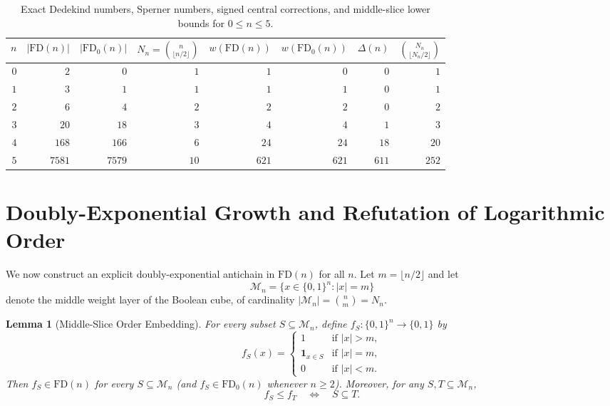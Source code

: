 \documentclass[11pt]{article}
\newtheorem{lemma}[theorem]{Lemma}
\theoremstyle{definition}
\newcommand{\FD}{\mathrm{FD}}
\newcommand{\FDz}{\mathrm{FD}_0}
\begin{document}
\begin{table}[ht]
\centering
\caption{Exact Dedekind numbers, Sperner numbers, signed central corrections, and middle-slice lower bounds for $0 \le n \le 5$.}
\label{tab:small-n}
\smallskip
\begin{tabular}{@{}rrrrrrrr@{}}
\toprule
$n$ & $|\FD(n)|$ & $|\FDz(n)|$ & $N_n = \binom{n}{\lfloor n/2 \rfloor}$ & $w(\FD(n))$ & $w(\FDz(n))$ & $\Delta(n)$ & $\binom{N_n}{\lfloor N_n/2 \rfloor}$ \\
\midrule
$0$ & $2$    & $0$    & $1$  & $1$   & $0$   & $0$   & $1$   \\
$1$ & $3$    & $1$    & $1$  & $1$   & $1$   & $0$   & $1$   \\
$2$ & $6$    & $4$    & $2$  & $2$   & $2$   & $0$   & $2$   \\
$3$ & $20$   & $18$   & $3$  & $4$   & $4$   & $1$   & $3$   \\
$4$ & $168$  & $166$  & $6$  & $24$  & $24$  & $18$  & $20$  \\
$5$ & $7581$ & $7579$ & $10$ & $621$ & $621$ & $611$ & $252$ \\
\bottomrule
\end{tabular}
\end{table}

\section{Doubly-Exponential Growth and Refutation of Logarithmic Order}

We now construct an explicit doubly-exponential antichain in $\FD(n)$ for all $n$. Let $m = \lfloor n/2 \rfloor$ and let
\[
  \mathcal{M}_n = \{x \in \{0,1\}^n : |x| = m\}
\]
denote the middle weight layer of the Boolean cube, of cardinality $|\mathcal{M}_n| = \binom{n}{m} = N_n$.

\begin{lemma}[Middle-Slice Order Embedding]\label{lem:mid-slice}
For every subset $S \subseteq \mathcal{M}_n$, define $f_S : \{0,1\}^n \to \{0,1\}$ by
\[
  f_S(x) = \begin{cases}
    1 & \text{if } |x| > m, \\
    \mathbf{1}_{x \in S} & \text{if } |x| = m, \\
    0 & \text{if } |x| < m.
  \end{cases}
\]
Then $f_S \in \FD(n)$ for every $S \subseteq \mathcal{M}_n$ (and $f_S \in \FDz(n)$ whenever $n \ge 2$). Moreover, for any $S, T \subseteq \mathcal{M}_n$,
\[
  f_S \le f_T \quad \Longleftrightarrow \quad S \subseteq T.
\]
\end{lemma}
\end{document}
